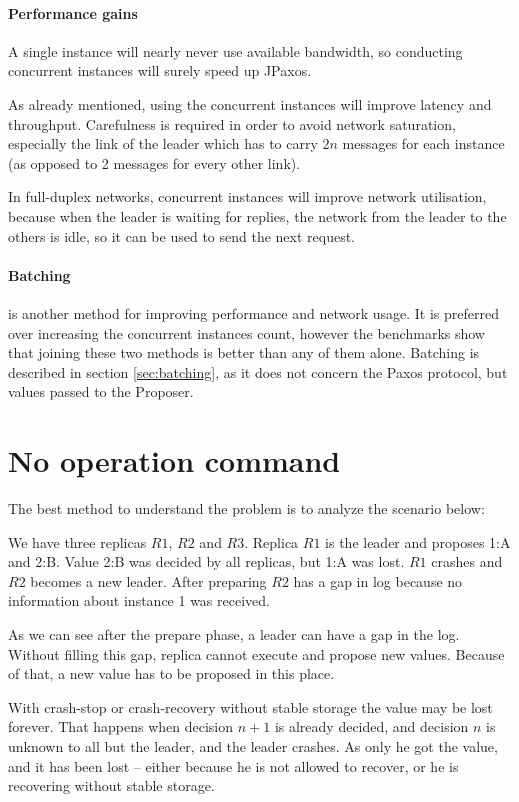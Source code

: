 \paragraph{Performance gains}
A single instance will nearly never use available bandwidth, so conducting concurrent instances will surely speed up JPaxos.

As already mentioned, using the concurrent instances will improve latency and throughput. Carefulness is required in order to avoid network saturation, especially the link of the leader which has to carry $2n$ messages for each instance (as opposed to 2 messages for every other link).

In full-duplex networks, concurrent instances will improve network utilisation, because when the leader is waiting for replies, the network from the leader to the others is idle, so it can be used to send the next request. 

\paragraph{Batching} is another method for improving performance and network usage. It is preferred over increasing the concurrent instances count, however
the benchmarks show %
that joining these two methods is better than any of them alone. Batching is described in section \ref{sec:batching}, as it does not concern the Paxos protocol, but values passed to the Proposer.

\section{No operation command}

The best method to understand the problem is to analyze the scenario below:

\begin{TODO} %

We have three replicas $R1$, $R2$ and $R3$. Replica $R1$ is the leader and proposes {1:A} and {2:B}. Value {2:B} was decided by all replicas, but {1:A} was lost. $R1$ crashes and $R2$ becomes a new leader. After preparing $R2$ has a gap in log because no information about instance 1 was received.

As we can see after the prepare phase, a leader can have a gap in the log. Without filling this gap, replica cannot execute and propose new values. Because of that, a new value has to be proposed in this place.

With crash-stop or crash-recovery without stable storage the value may be lost forever. That happens when decision $n+1$ is already decided, and decision $n$ is unknown to all but the leader, and the leader crashes. As only he got the value, and it has been lost -- either because he is not allowed to recover, or he is recovering without stable storage.

\end{TODO}

